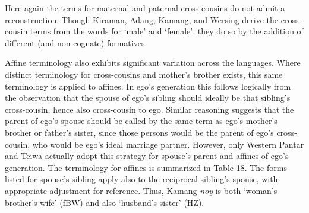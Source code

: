 Here again the terms for maternal and paternal cross-cousins do not admit a reconstruction. Though Kiraman, Adang, Kamang, and Wersing derive the cross-cousin terms from the words for `male' and `female', they do so by the addition of different (and non-cognate) formatives.

  Affine terminology also exhibits significant variation across the languages. Where distinct terminology for cross-cousins and mother's brother exists, this same terminology is applied to affines. In ego's generation this follows logically from the observation that the spouse of ego's sibling should ideally be that sibling's cross-cousin, hence also cross-cousin to ego. Similar reasoning suggests that the parent of ego's spouse should be called by the same term as ego's mother's brother or father's sister, since those persons would be the parent of ego's cross-cousin, who would be ego's ideal marriage partner. However, only Western Pantar and Teiwa actually adopt this strategy for spouse's parent and affines of ego's generation. The terminology for affines is summarized in Table 18. The forms listed for spouse's sibling apply also to the reciprocal sibling's spouse, with appropriate adjustment for reference. Thus, Kamang \textit{noy} is both `woman's brother's wife' (fBW) and also `husband's sister' (HZ).




